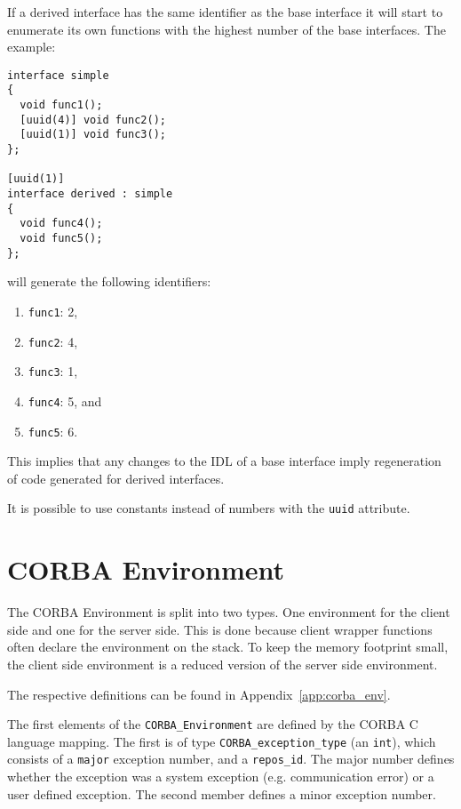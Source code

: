 If a derived interface has the same identifier as the base interface
it will start to enumerate its own functions with the highest number
of the base interfaces. The example:

\begin{verbatim}
interface simple
{
  void func1();
  [uuid(4)] void func2();
  [uuid(1)] void func3();
};

[uuid(1)]
interface derived : simple
{
  void func4();
  void func5();
};
\end{verbatim}

will generate the following identifiers:

\begin{enumerate}
\item \verb|func1|: 2,
\item \verb|func2|: 4,
\item \verb|func3|: 1,
\item \verb|func4|: 5, and
\item \verb|func5|: 6.
\end{enumerate}

This implies that any changes to the IDL of a base interface 
imply regeneration of code generated for derived interfaces.

It is possible to use constants instead of numbers
with the \verb|uuid| attribute.

\section{CORBA Environment}
\label{sec:environment}

The CORBA Environment is split into two types.  One environment for the client
side and one for the server side.  This is done because client wrapper 
functions often declare the environment on the stack.  To keep the memory
footprint small, the client side environment is a reduced version of the
server side environment.

The respective definitions can be found in Appendix~\ref{app:corba_env}.

The first elements of the \verb|CORBA_Environment| are defined
by the CORBA C language mapping. The first is of type 
\verb|CORBA_exception_type| (an \verb|int|), which consists of
a \verb|major| exception number, and a \verb|repos_id|. The major
number defines whether the exception was a system exception (e.g.
communication error) or a user defined exception. The second 
member defines a minor exception number. 

